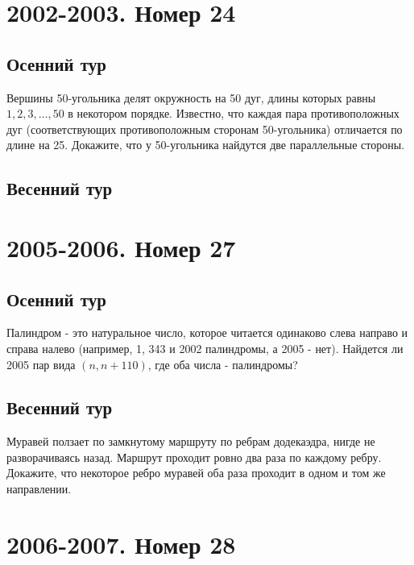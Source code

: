 \documentclass[11pt, a4paper]{common/document_template}
\begin{document}
\chapter{2002-2003. Номер 24}

\section{Осенний тур}

\begin{exercise}
Вершины 50-угольника делят окружность на 50 дуг, длины которых равны $1, 2, 3, \dots, 50$ в некотором порядке. Известно, что каждая пара противоположных дуг (соответствующих противоположным сторонам 50-угольника) отличается по длине на 25. Докажите, что у 50-угольника найдутся две параллельные стороны.
\end{exercise}

\section{Весенний тур}

\chapter{2005-2006. Номер 27}

\section{Осенний тур}

\begin{exercise}
Палиндром - это натуральное число, которое читается одинаково слева направо и справа налево (например, 1, 343 и 2002 палиндромы, а 2005 - нет). Найдется ли 2005 пар вида $(n, n + 110)$, где оба числа - палиндромы?
\end{exercise}

\section{Весенний тур}

\begin{exercise}
Муравей ползает по замкнутому маршруту по ребрам додекаэдра, нигде не разворачиваясь назад. Маршрут проходит ровно два раза по каждому ребру. Докажите, что некоторое ребро муравей оба раза проходит в одном и том же направлении.
\end{exercise}

\chapter{2006-2007. Номер 28}
\end{document}
